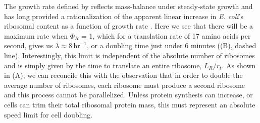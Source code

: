The growth rate defined by  reflects
mass-balance under steady-state growth and has long provided a rationalization
of the apparent linear increase in \textit{E. coli}'s ribosomal content as a
function of growth rate \citep{Goldberger1979, scott2010}. Here we see that
there will be a maximum rate when $\Phi_R$ = 1, which for a translation rate of
17 amino acids per second, gives us $\lambda \approx 8 \,\text{hr}^{-1}$, or a
doubling time just under 6 minutes ((B), dashed line).
Interestingly, this limit is independent of the absolute number of ribosomes and
is simply given by the time to translate an entire ribosome, $L_R/ r_t$. As
shown in (A), we can reconcile this with the observation
that in order to double the average number of ribosomes, each ribosome must
produce a second ribosome and this process cannot be parallelized. Unless
protein synthesis can increase, or cells can trim their total ribosomal protein
mass, this must represent an absolute speed limit for cell doubling.

